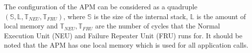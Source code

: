 The configuration of the APM can be considered as a quadruple
$(\mathbb{S},\mathbb{L},\mathbb{T}_{NEU},\mathbb{T}_{FRU})$,
where $\mathbb{S}$ is the size of the internal stack, $\mathbb{L}$ is the amount of local memory and
$\mathbb{T}_{NEU}, \mathbb{T}_{FRU}$ are the number of cycles that the Normal Execution Unit (NEU)
and Failure Repeater Unit (FRU) runs for. It should be noted that the APM has one local memory which
is used for all application calls.

%
